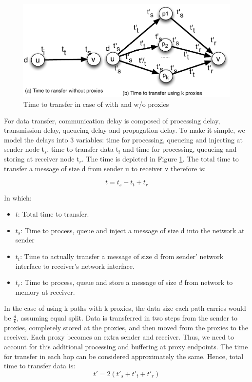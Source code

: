 \documentclass[final,5p,times]{elsarticle}
\begin{document}
\begin{figure}[!htb]
\vspace{-0.1in}
\centering
\includegraphics[scale=0.5]{figures/transfer_time.pdf}
\vspace{-0.2in}
\caption{Time to transfer in case of with and w/o proxies}
\vspace{-0.1in}
\label{fig:proxies}
\end{figure}
For data transfer, communication delay is composed of processing delay, transmission delay, queueing delay and propagation delay. To make it simple, we model the delays into 3 variables: time for processing, queueing and injecting at sender node t$_s$, time to transfer data t$_t$ and time for processing, queueing and storing at receiver node t$_r$. The time is depicted in Figure \ref{fig:proxies}. The total time to transfer a message of size d from sender u to receiver v therefore is:

\begin{equation}
t = t_s + t_t + t_r
\end{equation}

In which:
\begin{itemize}
\item $t$: Total time to transfer.
\item $t_s$: Time to process, queue and inject a message of size d into the network at sender
\item $t_t$: Time to actually transfer a message of size d from sender' network interface to receiver's network interface.
\item $t_r$: Time to process, queue and store a message of size $d$ from network to memory at receiver.
\end{itemize}

In the case of using k paths with k proxies, the data size each path carries would be $\frac{d}{k}$, assuming equal split. Data is transferred in two steps from the sender to proxies, completely stored at the proxies, and then moved from the proxies to the receiver. Each proxy becomes an extra sender and receiver. Thus, we need to account for this additional processing and buffering at proxy endpoints. The time for transfer in each hop can be considered approximately the same. Hence, total time to transfer data is:
\begin{equation}
t' = 2(t'_s + t'_t + t'_r) %
\end{equation}
\end{document}
